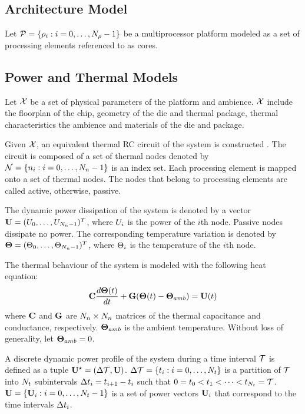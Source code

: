 \subsection{Architecture Model}
Let $\mathcal{P} = \{ \rho_i: i = 0, \dots, N_\rho - 1 \}$ be a multiprocessor platform modeled as a set of processing elements referenced to as cores.

\subsection{Power and Thermal Models}
Let $\mathcal{X}$ be a set of physical parameters of the platform and ambience. $\mathcal{X}$ include the floorplan of the chip, geometry of the die and thermal package, thermal characteristics the ambience and materials of the die and package.

Given $\mathcal{X}$, an equivalent thermal RC circuit of the system is constructed \cite{kreith2000}. The circuit is composed of a set of thermal nodes denoted by $\mathcal{N} = \{ n_i: i = 0, \dots, N_n - 1 \}$ is an index set. Each processing element is mapped onto a set of thermal nodes. The nodes that belong to processing elements are called active, otherwise, passive.

The dynamic power dissipation of the system is denoted by a vector $\mathbf{U} = (U_0, \dots, U_{N_n - 1})^T$, where $U_i$ is the power of the $i$th node. Passive nodes dissipate no power. The corresponding temperature variation is denoted by $\mathbf{\Theta} = (\Theta_0, \dots, \Theta_{N_n - 1})^T$, where $\Theta_i$ is the temperature of the $i$th node.

The thermal behaviour of the system is modeled with the following heat equation:
\begin{equation} \equlabel{fourier}
  \mcapacitance \frac{d\vtemperature(\time)}{d\time} + \mconductance (\vtemperature(\time) - \vtemperature_{amb}) = \vpower(\time)
\end{equation}
where $\mathbf{C}$ and $\mathbf{G}$ are $N_n \times N_n$ matrices of the thermal capacitance and conductance, respectively. $\mathbf{\Theta}_{amb}$ is the ambient temperature. Without loss of generality, let $\mathbf{\Theta}_{amb} = 0$.

A discrete dynamic power profile of the system during a time interval $\mathcal{T}$ is defined as a tuple $\mathbf{U}^\star = (\Delta \mathcal{T}, \mathbf{U})$. $\Delta \mathcal{T} = \{ t_i: i = 0, \dots, N_t \}$ is a partition of $\mathcal{T}$ into $N_t$ subintervals $\Delta t_i = t_{i+1} - t_i$ such that $0 = t_0 < t_1 < \dots < t_{N_t} = \mathcal{T}$. $\mathbf{U} = \{ \mathbf{U}_i: i = 0, \dots, N_t - 1 \}$ is a set of power vectors $\mathbf{U}_i$ that correspond to the time intervals $\Delta t_i$.

